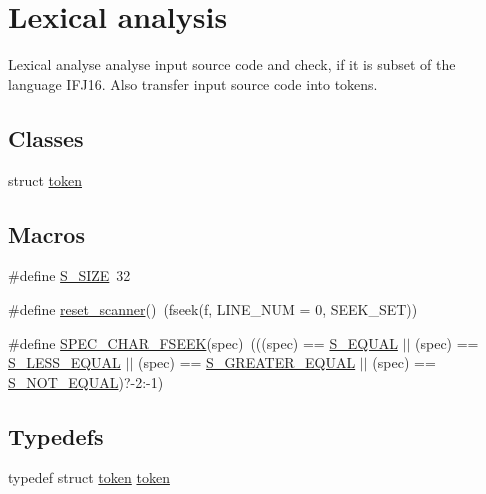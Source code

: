 \hypertarget{group__lexical__analysis}{}\section{Lexical analysis}
\label{group__lexical__analysis}


Lexical analyse analyse input source code and check, if it is subset of the language I\+F\+J16. Also transfer input source code into tokens.  


\subsection*{Classes}
\begin{DoxyCompactItemize}
\item 
struct \hyperlink{structtoken}{token}
\end{DoxyCompactItemize}
\subsection*{Macros}
\begin{DoxyCompactItemize}
\item 
\#define \hyperlink{group__lexical__analysis_gae527d47b61cec23db07c8142dd7b3454}{S\+\_\+\+S\+I\+ZE}~32
\item 
\#define \hyperlink{group__lexical__analysis_ga1f93f64777731443e51ee94601b3195c}{reset\+\_\+scanner}()~(fseek(f, L\+I\+N\+E\+\_\+\+N\+UM = 0, S\+E\+E\+K\+\_\+\+S\+ET))
\item 
\#define \hyperlink{group__lexical__analysis_gac470f012657c70805eb73ae2d23dfcd2}{S\+P\+E\+C\+\_\+\+C\+H\+A\+R\+\_\+\+F\+S\+E\+EK}(spec)~(((spec) == \hyperlink{group__lexical__analysis_gga99fb83031ce9923c84392b4e92f956b5aca36b0df9641e4e26d8bf3f7acdd9c1e}{S\+\_\+\+E\+Q\+U\+AL} $\vert$$\vert$ (spec) == \hyperlink{group__lexical__analysis_gga99fb83031ce9923c84392b4e92f956b5a539b597cbeb7b0504d07e74fe4c1e94e}{S\+\_\+\+L\+E\+S\+S\+\_\+\+E\+Q\+U\+AL} $\vert$$\vert$ (spec) == \hyperlink{group__lexical__analysis_gga99fb83031ce9923c84392b4e92f956b5a47e80e9966826028a795c61a4965b6d6}{S\+\_\+\+G\+R\+E\+A\+T\+E\+R\+\_\+\+E\+Q\+U\+AL} $\vert$$\vert$ (spec) == \hyperlink{group__lexical__analysis_gga99fb83031ce9923c84392b4e92f956b5a4c20fc681a0ad89811886c58c8af6885}{S\+\_\+\+N\+O\+T\+\_\+\+E\+Q\+U\+AL})?-\/2\+:-\/1)
\end{DoxyCompactItemize}
\subsection*{Typedefs}
\begin{DoxyCompactItemize}
\item 
typedef struct \hyperlink{structtoken}{token} \hyperlink{group__lexical__analysis_gacda13b36416bdee4294453dd28b0fdc4}{token}
\end{DoxyCompactItemize}
